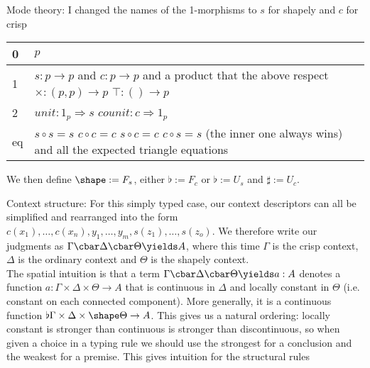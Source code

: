 \documentclass[a4paper,12pt]{article}
\begin{document}
Mode theory: I changed the names of the 1-morphisms to $s$ for shapely and $c$ for crisp
\begin{center}
  \begin{tabular}{| l | l |}
    \hline
    0 & $p$ \\
    \hline
    1 & \pbox{20cm}{
      $s : p \to p$ and $c : p \to p$ \\
      and a product that the above respect \\
      $\times : (p, p) \to p$ \hspace{2ex} $\top : () \to p$
    }\\
    \hline
    2 & $unit : 1_p \Rightarrow s$ \hspace{2ex} $counit : c \Rightarrow 1_p$ \\
    \hline
     eq & \pbox{20cm}{\vspace{1ex}
       $s \circ s = s$ \\
       $c \circ c = c$ \\
       $s \circ c = c$ \\
       $c \circ s = s$ \\
       (the inner one always wins) \\
        and all the expected triangle equations
    }\\
    \hline
  \end{tabular}
\end{center}
We then define $\shape := F_s$, either $\flat := F_c$ or $\flat := U_s$ and $\sharp := U_c$.

Context structure: For this simply typed case, our context descriptors can all be simplified and rearranged into the form $c(x_1) , \dots , c(x_n) , y_1 , \dots , y_m , s(z_1) , \dots , s(z_o)$. We therefore write our judgments as $\Gamma \cbar \Delta \cbar \Theta \yields A$, where this time $\Gamma$ is the crisp context, $\Delta$ is the ordinary context and $\Theta$ is the shapely context.\\
The spatial intuition is that a term $\Gamma\cbar\Delta\cbar\Theta\yields a : A$ denotes a function $a : \Gamma\times\Delta\times\Theta\to A$ that is continuous in $\Delta$ and locally constant in $\Theta$ (i.e. constant on each connected component). More generally, it is a continuous function $\flat\Gamma\times\Delta\times\shape\Theta \to A$. This gives us a natural ordering: locally constant is stronger than continuous is stronger than discontinuous, so when given a choice in a typing rule we should use the strongest for a conclusion and the weakest for a premise. This gives intuition for the structural rules
\end{document}
